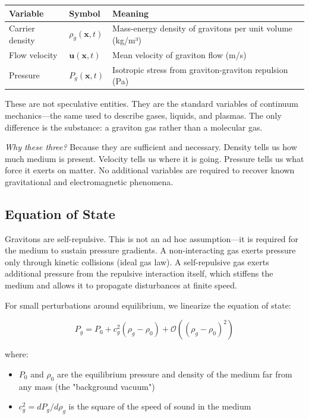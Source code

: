 \documentclass[12pt, a4paper]{article}
\begin{document}
\begin{center}
\begin{tabular}{|p{3cm}|p{3.5cm}|p{8cm}|}
\hline
\textbf{Variable} & \textbf{Symbol} & \textbf{Meaning} \\
\hline
Carrier density & \( \rho_g(\mathbf{x}, t) \) & Mass-energy density of gravitons per unit volume (kg/m³) \\
\hline
Flow velocity & \( \mathbf{u}(\mathbf{x}, t) \) & Mean velocity of graviton flow (m/s) \\
\hline
Pressure & \( P_g(\mathbf{x}, t) \) & Isotropic stress from graviton-graviton repulsion (Pa) \\
\hline
\end{tabular}
\end{center}

These are not speculative entities. They are the standard variables of continuum mechanics—the same used to describe gases, liquids, and plasmas. The only difference is the substance: a graviton gas rather than a molecular gas.

\textit{Why these three?} Because they are sufficient and necessary. Density tells us how much medium is present. Velocity tells us where it is going. Pressure tells us what force it exerts on matter. No additional variables are required to recover known gravitational and electromagnetic phenomena.

\subsection{Equation of State}
\label{subsec:eos}

Gravitons are self-repulsive. This is not an ad hoc assumption—it is required for the medium to sustain pressure gradients. A non-interacting gas exerts pressure only through kinetic collisions (ideal gas law). A self-repulsive gas exerts additional pressure from the repulsive interaction itself, which stiffens the medium and allows it to propagate disturbances at finite speed.

For small perturbations around equilibrium, we linearize the equation of state:

\[
P_g = P_0 + c_g^2 (\rho_g - \rho_0) + \mathcal{O}((\rho_g - \rho_0)^2)
\]

where:
\begin{itemize}
    \item \( P_0 \) and \( \rho_0 \) are the equilibrium pressure and density of the medium far from any mass (the "background vacuum")
    \item \( c_g^2 = dP_g/d\rho_g \) is the square of the speed of sound in the medium
\end{itemize}
\end{document}
